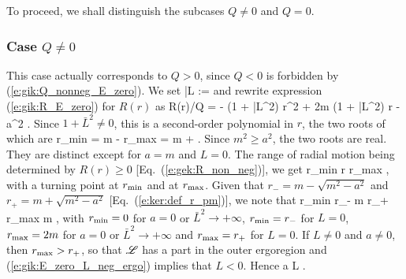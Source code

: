 To proceed, we shall distinguish the subcases $Q\neq 0$ and $Q=0$.

\subsubsection{Case $Q\neq 0$}

This case actually corresponds to $Q > 0$, since $Q<0$ is forbidden by
(\ref{e:gik:Q_nonneg_E_zero}). We set
\be \label{e:gik:def_L_bar}
    \bar{L} := 
\ee
and rewrite expression (\ref{e:gik:R_E_zero}) for $R(r)$ as
\be \label{e:gik:R_E_zero_Lb}
    R(r)/Q  = - (1 + \bar{L}^2) r^2 + 2m (1 + \bar{L}^2) r - a^2 .
\ee
Since $1 + \bar{L}^2 \neq 0$, this is a second-order polynomial in $r$,
the two roots of which are
\be \label{e:gik:E_zero_rmin_rmax}
    r_{\rm min} = m - 
    \qand
    r_{\rm max} = m +  .
\ee
Since $m^2 \geq a^2$, the two roots are real. They are distinct
except for $a=m$ and $L=0$.
The range of radial motion being determined by $R(r)\geq 0$
[Eq.~(\ref{e:gek:R_non_neg})], we get
\be
    r_{\rm min} \leq r \leq r_{\rm max} ,
\ee
with a turning point at $r_{\rm min}$ and at $r_{\rm max}$.
Given that $r_- = m - \sqrt{m^2 - a^2}$ and $r_+ = m + \sqrt{m^2 - a^2}$
[Eq.~(\ref{e:ker:def_r_pm})], we note that
 \leq r_{\rm min} \leq r_- \leq m \leq r_+ \leq r_{\rm max}  m ,
\ee
with $r_{\rm min} = 0$ for $a = 0$ or $\bar{L}^2 \to +\infty$,
$r_{\rm min} = r_-$ for $L=0$, $r_{\rm max} = 2m$ for $a=0$
or $\bar{L}^2 \to +\infty$ and $r_{\rm max} = r_+$ for $L=0$.
If $L\neq 0$ and $a\neq 0$, then $r_{\rm max} > r_+$, so that $\mathscr{L}$ has a part in the outer
ergoregion and (\ref{e:gik:E_zero_L_neg_ergo}) implies that $L < 0$. Hence
\be \label{e:gik:E_zero_Qnz_L_neg}
    a \implies L  .
\ee

